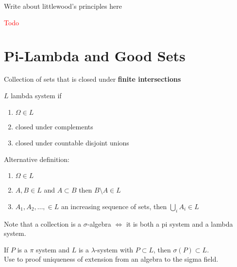 \documentclass{article}
\newcommand\myworries[1]{\textcolor{red}{#1}}
\begin{document}
Write about littlewood's principles here 

\begin{example}
\myworries{Todo}
\end{example}

\section{Pi-Lambda and Good Sets}

\begin{definition}[$\pi$-system]
Collection of sets that is closed under \textbf{finite intersections}
\end{definition}
\begin{definition}
$L$ lambda system if
\begin{enumerate}
	\item $\Omega \in L$
	\item closed under complements
	\item closed under countable disjoint unions
\end{enumerate}
Alternative definition:
\begin{enumerate}
	\item $\Omega \in L$
	\item $A,B \in L$ and $A\subset B$ then $B\setminus A \in L$
	\item $A_1, A_2,\ldots, \in L$ an increasing sequence of sets, then $\bigcup_i A_i \in L$
\end{enumerate}
\end{definition}
Note that a collection is a $\sigma$-algebra $\iff$ it is both a pi system and a lambda system.  
\begin{theorem}
If $P$ is a $\pi$ system and $L$ is a $\lambda$-system with $P\subset L$, then $\sigma(P)\subset L$.\\
Use to proof uniqueness of extension from an algebra to the sigma field.
\end{theorem}
\begin{example}
\end{example}
\end{document}
